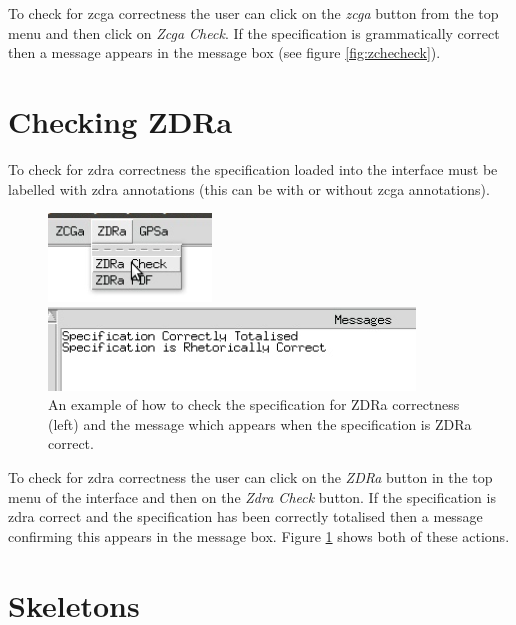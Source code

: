 To check for \gls{zcga} correctness the user can click on the \emph{zcga} button
from the top menu and then click on \emph{Zcga Check}. If the specification is
grammatically correct then a message appears in the message box (see figure \ref{fig:zchecheck}).

\section{Checking ZDRa}

To check for \gls{zdra} correctness the specification loaded into the interface
must be labelled with \gls{zdra} annotations (this can be with or without
\gls{zcga} annotations).

\begin{figure}[H]
\centering
\begin{minipage}{0.4\textwidth}
\centering
\includegraphics[scale=0.7]{Figures/Interface/zdracheck.png}
\end{minipage}\hfill
\begin{minipage}{0.6\textwidth}
\centering
\includegraphics[scale=0.6]{Figures/Interface/zdracorrect.png}
\end{minipage}
\caption{An example of how to check the specification for ZDRa correctness (left) and the message which appears when the specification is ZDRa correct.  \label{fig:zdracheck}}
\end{figure}

To check for \gls{zdra} correctness the user can click on the \emph{ZDRa} button
in the top menu of the interface and then on the \emph{Zdra Check} button. If
the specification is \gls{zdra} correct and the specification has been correctly
totalised then a message confirming this appears in the message box. Figure
\ref{fig:zdracheck} shows both of these actions.

\section{Skeletons}


